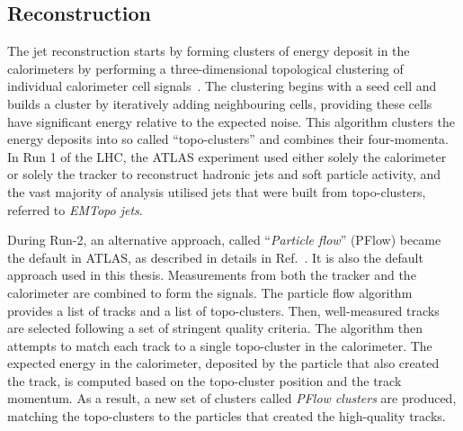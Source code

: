 \subsection{Reconstruction}
The jet reconstruction starts by forming clusters of energy deposit
in the calorimeters by performing a three-dimensional topological clustering 
of individual calorimeter cell signals~\cite{Aad_2017}.
The clustering begins with a seed cell and builds a cluster by iteratively
adding neighbouring cells, providing these cells 
have significant energy relative to the expected noise.
This algorithm clusters the energy deposits into so called ``topo-clusters'' 
and combines their four-momenta. 
In Run 1 of the LHC, the ATLAS experiment used either
solely the calorimeter or solely the tracker to reconstruct
hadronic jets and soft particle activity, 
and the vast majority of analysis utilised jets that were built 
from topo-clusters, referred to \textit{EMTopo jets}.


During Run-2, an alternative approach,
called ``\textit{Particle flow}'' (PFlow) became the default
in ATLAS, as described in details in Ref.~\cite{PERF-2015-09}. 
It is also the default approach used in this thesis.
Measurements from both the tracker and the calorimeter 
are combined to form the signals. 
The particle flow algorithm provides a list of tracks 
and a list of topo-clusters.
Then, well-measured tracks are selected following a set 
of stringent quality criteria. 
The algorithm then attempts to match each track to a single topo-cluster in
the calorimeter. 
The expected energy in the calorimeter, deposited by the particle that also
created the track, 
is computed based on the topo-cluster position and the track momentum.
As a result, a new set of clusters called \textit{PFlow clusters} are produced,
matching the topo-clusters to the particles that created the high-quality tracks. 



